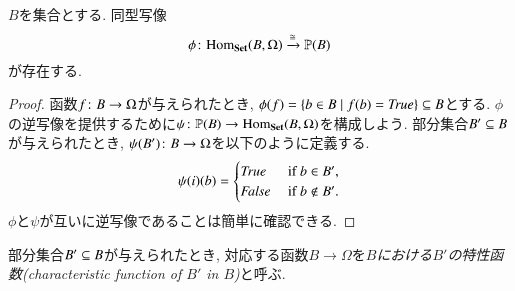 \begin{proposition}\label{prop:characteristic function}


$B$を集合とする. 同型写像$$\phi\taking\Hom_\Set(B,\Omega)\To{\iso}\PP(B)$$
が存在する.

\end{proposition}

\begin{proof}


函数$f\taking B\to\Omega$が与えられたとき, $\phi(f)=\{b\in B\|f(b)=\mathit{True}\}\ss B$とする. $\phi$の逆写像を提供するために$\psi\taking\PP(B)\to\Hom_\Set(B,\Omega)$を構成しよう. 部分集合$B'\ss B$が与えられたとき, $\psi(B')\taking B\to\Omega$を以下のように定義する.
$$\psi(i)(b)=\begin{cases}
\mathit{True}&\tn{ if } b\in B',\\
\mathit{False}&\tn{ if } b\not\in B'.
\end{cases}
$$
$\phi$と$\psi$が互いに逆写像であることは簡単に確認できる.
\end{proof}

\begin{definition}[特性函数]


部分集合$B'\ss B$が与えられたとき, 対応する函数$B\to\Omega$を\emph{$B$における$B'$の特性函数(characteristic function of $B'$ in $B$)}と呼ぶ.

\end{definition}


